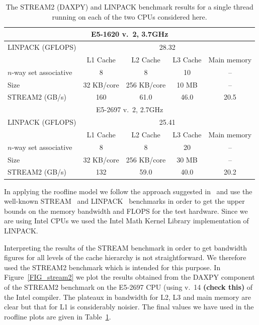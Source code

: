 \documentclass[12pt]{article}
\begin{document}
\begin{table}
\begin{tabular}{|l|c|c|c|c|}
\hline
  \multicolumn{5}{|c|}{E5-1620 v.~2, 3.7GHz} \\
  \hline
LINPACK (GFLOPS) & \multicolumn{4}{c|}{28.32} \\
\hline
&  L1 Cache & L2 Cache & L3 Cache & Main memory \\
$n$-way set associative & 8    & 8   & 10 & -- \\
Size                  &   32 KB/core   & 256 KB/core   & 10 MB    &  --         \\
\hline
STREAM2 (GB/s)   &  160  &  61.0  & 46.0 &  20.5 \\
  \hline
\multicolumn{5}{|c|}{E5-2697 v.~2, 2.7GHz}  \\
\hline
LINPACK (GFLOPS) & \multicolumn{4}{c|}{25.41} \\
\hline
               & L1 Cache & L2 Cache & L3 Cache & Main memory \\
$n$-way set associative & 8    & 8   & 20 & -- \\
Size           &   32 KB/core  & 256 KB/core   & 30 MB    &  --         \\
\hline
STREAM2 (GB/s) & 132      & 59.0     & 40.0     &  20.2 \\
\hline
\end{tabular}
\caption{The STREAM2 (DAXPY) and LINPACK benchmark results for a
  single thread running on each of the two CPUs considered here.}
\label{TAB_stream_linpack}
\end{table}

In applying the roofline model we follow the approach suggested
in~\cite{para_pearls} and use the well-known STREAM~\cite{stream} and
LINPACK~\cite{linpack} benchmarks in order to get the upper bounds on
the memory bandwidth and FLOPS for the test hardware. Since we are
using Intel CPUs we used the Intel Math Kernel Library implementation
of LINPACK.

Interpreting the results of the STREAM benchmark in order to get
bandwidth figures for all levels of the cache hierarchy is not
straightforward. We therefore used the STREAM2 benchmark which is
intended for this purpose. In Figure~\ref{FIG_stream2} we plot the
results obtained from the DAXPY component of the STREAM2 benchmark on
the E5-2697 CPU (using v.~14 {\bf (check this)} of the Intel
compiler. The plateaux in bandwidth for L2, L3 and main memory are
clear but that for L1 is considerably noisier. The final values we
have used in the roofline plots are given in
Table~\ref{TAB_stream_linpack}.
\end{document}
